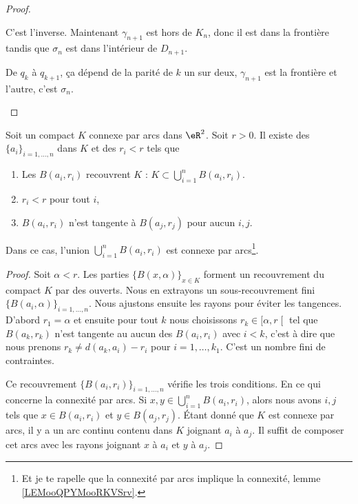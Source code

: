 \begin{proof}
\begin{subproof}
		\spitem[De \( q_2\) à \( q_3\)]
		C'est l'inverse. Maintenant \( \gamma_{n+1}\) est hors de \( K_n\), donc il est dans la frontière tandis que \( \sigma_n\) est dans l'intérieur de \( D_{n+1}\).

		De \( q_k\) à \( q_{k+1}\), ça dépend de la parité de \( k\) un sur deux, \( \gamma_{n+1}\) est la frontière et l'autre, c'est \( \sigma_n\).
	\end{subproof}
\end{proof}


\begin{proposition}	\label{PROPooLRJAooSTapDM}
	Soit un compact \( K\) connexe par arcs dans \( \eR^2\). Soit \( r>0\). Il existe des \( \{ a_i \}_{i=1,\ldots,n}\) dans \( K\) et des \( r_i<r\) tels que
	\begin{enumerate}
		\item
		      Les \( B(a_i,r_i)\) recouvrent \( K\) : \( K\subset \bigcup_{i=1}^n B(a_i,r_i)\).
		\item
		      \( r_i<r\) pour tout \( i\),
		\item
		      \( B(a_i,r_i)\) n'est tangente à \( B(a_j,r_j)\) pour aucun \( i,j\).
	\end{enumerate}
	Dans ce cas, l'union \( \bigcup_{i=1}^nB(a_i,r_i)\) est connexe par arcs\footnote{Et je te rapelle que la connexité par arcs implique la connexité, lemme \ref{LEMooQPYMooRKVSrv}.}.
\end{proposition}

\begin{proof}
	Soit \( \alpha<r\). Les parties \( \{ B(x,\alpha) \}_{x\in K}\) forment un recouvrement du compact \( K\) par des ouverts. Nous en extrayons un sous-recouvrement fini \( \{ B(a_i,\alpha) \}_{i=1,\ldots,n}\). Nous ajustons ensuite les rayons pour éviter les tangences. D'abord \( r_1=\alpha\) et ensuite pour tout \( k\) nous choisissons \( r_k\in\mathopen[ \alpha,r\mathclose[\) tel que \( B(a_k,r_k)\) n'est tangente au aucun des \( B(a_i,r_i)\) avec \( i<k\), c'est à dire que nous prenons \( r_k\neq d(a_k,a_i)-r_i\) pour \( i=1,\ldots,k_1\). C'est un nombre fini de contraintes.

	Ce recouvrement \( \{ B(a_i,r_i) \}_{i=1,\ldots,n}\) vérifie les trois conditions. En ce qui concerne la connexité par arcs. Si \( x,y\in \bigcup_{i=1}^nB(a_i,r_i)\), alors nous avons \( i,j\) tels que \( x\in B(a_i,r_i)\) et \( y\in B(a_j,r_j)\). Étant donné que \( K\) est connexe par arcs, il y a un arc continu contenu dans \( K\) joignant \( a_i\) à \( a_j\). Il suffit de composer cet arcs avec les rayons joignant \( x\) à \( a_i\) et \( y\) à \( a_j\).
\end{proof}


